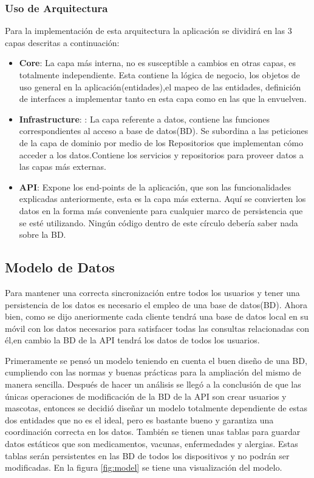 \subsubsection{Uso de Arquitectura}
Para la implementación de esta arquitectura la aplicación se dividirá en las 3 capas descritas a continuación:

\begin{itemize}
	\item \textbf{Core}: La capa más interna, no es susceptible a cambios en otras capas, es totalmente independiente. Esta contiene la lógica de negocio, los objetos de uso general en la aplicación(entidades),el mapeo de las entidades, definición de interfaces a implementar tanto en esta capa como en las que la envuelven.
	
	\item \textbf{Infrastructure}: : La capa referente a datos, contiene las funciones correspondientes al acceso a base de datos(BD). Se subordina a las peticiones de la capa de dominio por medio de los
	Repositorios que implementan cómo acceder a los datos.Contiene los servicios y repositorios para proveer datos a las capas más externas.
	
	\item \textbf{API}: Expone los end-points de la aplicación, que son las funcionalidades explicadas anteriormente, esta es la capa más externa. Aquí se convierten los datos  en la forma más conveniente para cualquier marco de persistencia que se esté utilizando. Ningún código dentro de este círculo debería saber nada sobre la BD.
	
\end{itemize}
\newpage

\subsection{Modelo de Datos }

Para mantener una correcta sincronización entre todos los usuarios y tener una persistencia de  los datos es necesario el empleo de una base de datos(BD). Ahora bien, como se dijo aneriormente cada cliente tendrá una base de datos local en su móvil con los datos necesarios para satisfacer todas las consultas relacionadas con él,en cambio la BD de la API tendrá los datos de todos los usuarios. 

Primeramente se pensó un modelo teniendo en cuenta el buen diseño de una BD, cumpliendo con las normas y buenas prácticas para la ampliación del mismo de manera sencilla. Después de hacer un análisis se llegó a la conclusión de que las únicas operaciones de modificación de la BD de la API son crear  usuarios y mascotas, entonces se decidió diseñar un modelo totalmente dependiente de estas dos entidades que no es el ideal, pero es bastante bueno y garantiza una coordinación correcta en los datos. También se tienen unas tablas para guardar datos estáticos que son medicamentos, vacunas, enfermedades y alergias. Estas tablas serán persistentes en las BD de todos los dispositivos y no podrán ser modificadas. En la figura \ref{fig:model} se tiene una visualización del modelo.

